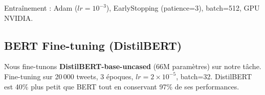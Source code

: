 Entraînement : Adam ($lr=10^{-3}$), EarlyStopping (patience=3), batch=512, GPU NVIDIA.

\subsection{BERT Fine-tuning (DistilBERT)}

Nous fine-tunons \textbf{DistilBERT-base-uncased} (66M paramètres) sur notre tâche.
Fine-tuning sur 20\,000 tweets, 3 époques, $lr = 2 \times 10^{-5}$, batch=32.
DistilBERT est 40\% plus petit que BERT tout en conservant 97\% de ses performances.
